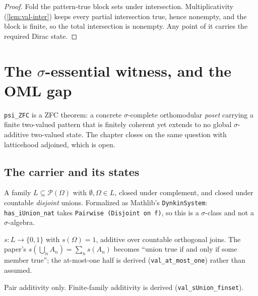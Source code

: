 \begin{proof}
  \leanok
  Fold the pattern-true block sets under intersection. Multiplicativity
  (\ref{lem:val-inter}) keeps every partial intersection true, hence nonempty,
  and the block is finite, so the total intersection is nonempty. Any point of it
  carries the required Dirac state.
\end{proof}
\chapter{The $\sigma$-essential witness, and the OML gap}

\texttt{psi\_ZFC} is a ZFC theorem: a concrete $\sigma$-complete orthomodular
\emph{poset} carrying a finite two-valued pattern that is finitely coherent yet
extends to no global $\sigma$-additive two-valued state. The chapter closes on
the same question with latticehood adjoined, which is open.

\section{The carrier and its states}

\begin{definition}[$\sigma$-class = concrete $\sigma$-complete OMP]
\label{def:sigma-class}
\leanok
A family $L \subseteq \mathcal{P}(\Omega)$ with $\emptyset, \Omega \in L$,
closed under complement, and closed under countable \emph{disjoint} unions.
Formalized as Mathlib's \texttt{DynkinSystem}: \texttt{has\_iUnion\_nat} takes
\texttt{Pairwise (Disjoint on f)}, so this is a $\sigma$-class and not a
$\sigma$-algebra.
\end{definition}

\begin{definition}
\label{def:two-valued-state}
\leanok
{}
$s : L \to \{0,1\}$ with $s(\Omega) = 1$, additive over countable orthogonal
joins. The paper's $s(\bigcup_n A_n) = \sum_n s(A_n)$ becomes ``union true
if and only if some member true''; the at-most-one half is derived
(\texttt{val\_at\_most\_one}) rather than assumed.
\end{definition}

\begin{definition}
\label{def:finadd-state}
\leanok
{}
Pair additivity only. Finite-family additivity is derived
(\texttt{val\_sUnion\_finset}).
\end{definition}

